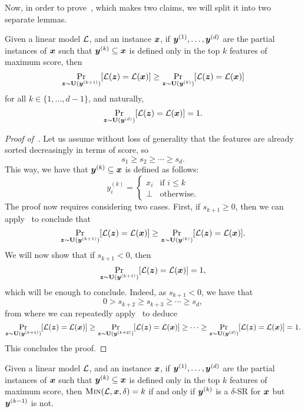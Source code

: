 Now, in order to prove~, which makes two claims, we will split it into two separate lemmas. 
\begin{lemma}\label{lemma:greedy-1}
    Given a linear model $\mathcal{L}$, and an instance ${\bm{x}}$, if ${\bm{y}}^{(1)}, \ldots, {\bm{y}}^{(d)}$ are the partial instances of ${\bm{x}}$ such that ${\bm{y}}^{(k)} \subseteq {\bm{x}}$ is defined only in the top $k$ features of maximum score, then
    \[ 
        \Pr_{{\bm{z}} \sim \mathbf{U}({\bm{y}}^{(k+1)})}[\mathcal{L}({\bm{z}}) = \mathcal{L}({\bm{x}})] \geq \Pr_{{\bm{z}} \sim \mathbf{U}({\bm{y}}^{(k)})}[\mathcal{L}({\bm{z}}) = \mathcal{L}({\bm{x}})]
    \]
    for all $k \in \{1, \ldots, d-1\}$, and naturally, 
    \[ 
    \Pr_{{\bm{z}} \sim \mathbf{U}({\bm{y}}^{(d)})}[\mathcal{L}({\bm{z}}) = \mathcal{L}({\bm{x}})] = 1.
    \]
\end{lemma}
\begin{proof}[Proof of~]
Let us assume without loss of generality that the features are already sorted decreasingly in terms of score, so \[s_1 \geq s_2 \geq \cdots \geq s_d.\]
This way, we have that ${\bm{y}}^{(k)} \subseteq {\bm{x}}$ is defined as follows:
\[ 
    y^{(k)}_i = \begin{cases}
        x_i & \text{if } i \leq k\\
        \bot & \text{otherwise}.
    \end{cases}
\]
The proof now requires considering two cases. First, if $s_{k+1} \geq 0$, then we can apply~ to conclude that
\[ 
    \Pr_{{\bm{z}} \sim \mathbf{U}({\bm{y}}^{(k+1)})}[\mathcal{L}({\bm{z}}) = \mathcal{L}({\bm{x}})] \geq \Pr_{{\bm{z}} \sim \mathbf{U}({\bm{y}}^{(k)})}[\mathcal{L}({\bm{z}}) = \mathcal{L}({\bm{x}})].
\]
We will now show that if $s_{k+1} < 0$, then 
\[ 
    \Pr_{{\bm{z}} \sim \mathbf{U}({\bm{y}}^{(k+1)})}[\mathcal{L}({\bm{z}}) = \mathcal{L}({\bm{x}})] = 1,
\]
which will be enough to conclude. Indeed, as $s_{k+1} < 0$, we have that 
\[
   0 > s_{k+2} \geq s_{k+3} \geq \cdots \geq s_d, 
\]
from where we can repeatedly apply~ to deduce 
\[ 
    \Pr_{{\bm{z}} \sim \mathbf{U}({\bm{y}}^{(k+1)})}[\mathcal{L}({\bm{z}}) = \mathcal{L}({\bm{x}})]  \geq \Pr_{{\bm{z}} \sim \mathbf{U}({\bm{y}}^{(k+2)})}[\mathcal{L}({\bm{z}}) = \mathcal{L}({\bm{x}})] \geq \cdots \geq \Pr_{{\bm{z}} \sim \mathbf{U}({\bm{y}}^{(d)})}[\mathcal{L}({\bm{z}}) = \mathcal{L}({\bm{x}})] = 1.
\]
This concludes the proof.
\end{proof}
\begin{lemma}\label{lemma:greedy-2}
    Given a linear model $\mathcal{L}$, and an instance ${\bm{x}}$, if ${\bm{y}}^{(1)}, \ldots, {\bm{y}}^{(d)}$ are the partial instances of ${\bm{x}}$ such that ${\bm{y}}^{(k)} \subseteq {\bm{x}}$ is defined only in the top $k$ features of maximum score, then $\operatorname{\textsc{Min}}(\mathcal{L}, {\bm{x}}, \delta) = k$ if and only if ${\bm{y}}^{(k)}$ is a $\delta$-SR for ${\bm{x}}$ but ${\bm{y}}^{(k-1)}$ is not. 
\end{lemma}

